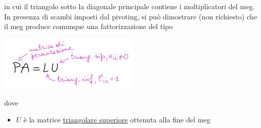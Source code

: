 \documentclass[12pt,a4paper]{article}
\begin{document}
in cui il triangolo sotto la diagonale principale contiene i moltiplicatori del meg.\\
In presenza di scambi imposti dal pivoting, si può dimostrare (non richiesto) che il meg produce comunque una fattorizzazione del tipo
\begin{center}
    \includegraphics[width = 0.5\textwidth]{pag17.jpg}
\end{center}
dove
\begin{itemize}
    \item $U$ è la matrice \uline{triangolare superiore} ottenuta alla fine del meg
    

\end{itemize}
\end{document}
